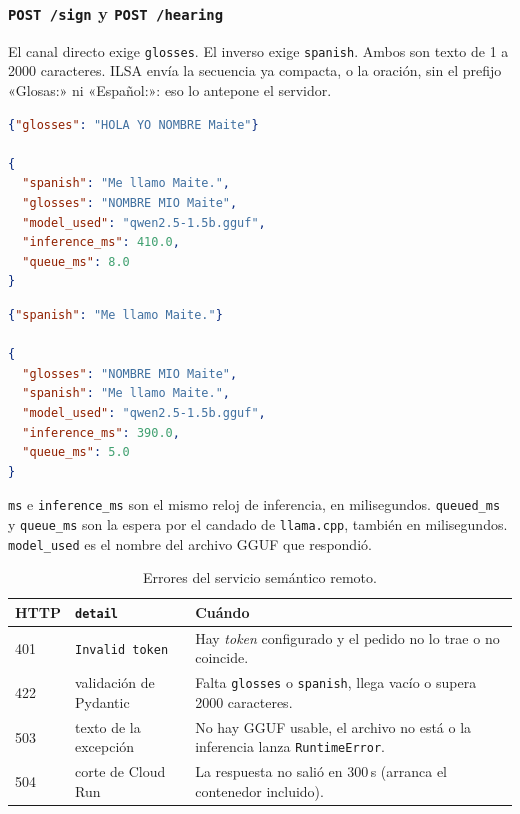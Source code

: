 \subsubsection{\texttt{POST /sign} y \texttt{POST /hearing}}

El canal directo exige \texttt{glosses}. El inverso exige \texttt{spanish}. Ambos son texto de 1 a 2000 caracteres. ILSA envía la secuencia ya compacta, o la oración, sin el prefijo «Glosas:» ni «Español:»: eso lo antepone el servidor.

\begin{lstlisting}[language=json]
{"glosses": "HOLA YO NOMBRE Maite"}

{
  "spanish": "Me llamo Maite.",
  "glosses": "NOMBRE MIO Maite",
  "model_used": "qwen2.5-1.5b.gguf",
  "inference_ms": 410.0,
  "queue_ms": 8.0
}
\end{lstlisting}

\begin{lstlisting}[language=json]
{"spanish": "Me llamo Maite."}

{
  "glosses": "NOMBRE MIO Maite",
  "spanish": "Me llamo Maite.",
  "model_used": "qwen2.5-1.5b.gguf",
  "inference_ms": 390.0,
  "queue_ms": 5.0
}
\end{lstlisting}

\texttt{ms} e \texttt{inference\_ms} son el mismo reloj de inferencia, en milisegundos. \texttt{queued\_ms} y \texttt{queue\_ms} son la espera por el candado de \texttt{llama.cpp}, también en milisegundos. \texttt{model\_used} es el nombre del archivo GGUF que respondió.

\begin{table}[H]
  \centering
  \caption{Errores del servicio semántico remoto.}
  \label{tab:api-sem-err}
  \small
  \begin{tabularx}{\textwidth}{@{}l l >{\raggedright\arraybackslash}X@{}}
    \toprule
    \textbf{HTTP} & \textbf{\texttt{detail}} & \textbf{Cuándo} \\
    \midrule
    401 & \texttt{Invalid token} & Hay \textit{token} configurado y el pedido no lo trae o no coincide. \\
    422 & validación de Pydantic & Falta \texttt{glosses} o \texttt{spanish}, llega vacío o supera 2000 caracteres. \\
    503 & texto de la excepción & No hay GGUF usable, el archivo no está o la inferencia lanza \texttt{RuntimeError}. \\
    504 & corte de Cloud Run & La respuesta no salió en $300$\,s (arranca el contenedor incluido). \\
    \bottomrule
  \end{tabularx}
\end{table}

